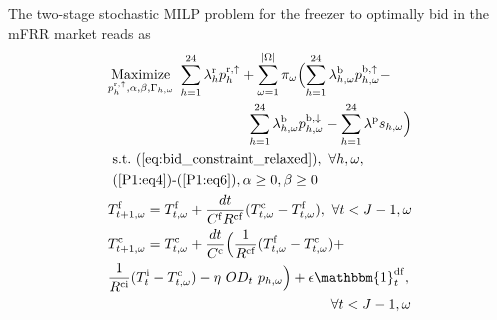 {\begingroup
\allowdisplaybreaks
The two-stage stochastic MILP problem for the freezer to optimally bid in the mFRR market reads as
%
\begin{subequations}\label{P2:FinalModel}
    \begin{align}
       & \underset{p_{h}^{\rm{r},\uparrow}, \alpha, \beta, \Gamma_{h,\omega}}{\text{Maximize}} \ \sum_{h=1}^{24}\lambda_{h}^{\rm{r}} p^{\rm{r}, \uparrow}_{h}+ \sum_{\omega=1}^{|\Omega|} \pi_{\omega}  \Bigl(\sum_{h=1}^{24}  \lambda_{h,\omega}^{\rm{b}} p^{\rm{b},\uparrow}_{h,\omega} - \notag                                                     \\  &  \hspace{3.5cm}\sum_{h=1}^{24}  \lambda_{h,\omega}^{\rm{b}} p^{\rm{b},\downarrow}_{h,\omega} - \sum_{h=1}^{24}  \lambda^{\rm{p}}s_{h,\omega} \Bigr) \label{P2:1} \\
        & \   \text{s.t.}  \  (\ref{eq:bid_constraint_relaxed}), \ \forall{h,\omega},   \label{P2:2}    \\ 
        & \                                               \text{(\ref{P1:eq4})-(\ref{P1:eq6})}, \alpha \geq 0,   \beta \geq 0 \    \label{P2:3}    \\ 
%
& T^{\rm{f}}_{t+1,\omega} = T^{\rm{f}}_{t,\omega} +  \frac{dt}{C^{\rm{f}}R^{\rm{cf}}} (T^{\rm{c}}_{t,\omega} - T^{\rm{f}}_{t,\omega}), \ \forall{t<J-1,\omega} \label{P2:state-space-1}                                                                                         \\
& T^{\rm{c}}_{t+1,\omega} = T^{\rm{c}}_{t,\omega} +    \frac{dt}{C^{\rm{c}}}\Bigl(\frac{1}{R^{\rm{cf}}} (T^{\rm{f}}_{t,\omega} - T^{\rm{c}}_{t,\omega}) +  \notag \\ & \frac{1}{R^{\rm{ci}}} (T^{\rm{i}}_t - T^{\rm{c}}_{t,\omega}) - \eta  \  OD_t \ p_{h,\omega} \Bigr) + \epsilon \mathbbm{1}^{\rm{df}}_{t}, \notag \\ & \hspace{5.6cm} \forall{t<J-1,\omega} \label{P2:state-space-2} \\

\end{align}
\end{subequations}}
